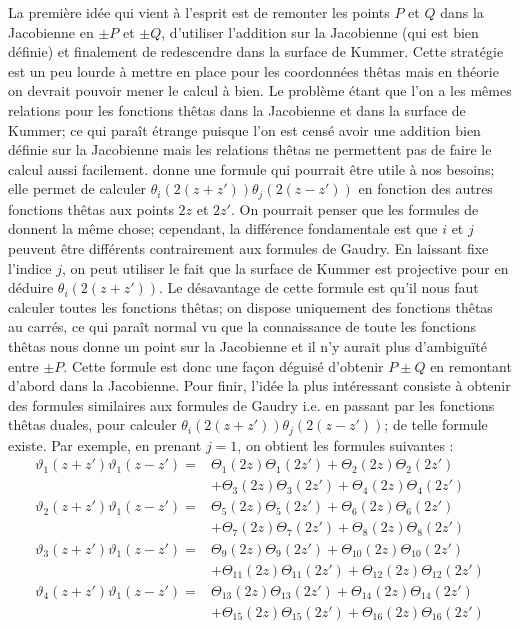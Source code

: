 \documentclass[a4paper]{article}
\theoremstyle{definition}
\theoremstyle{remark}
\numberwithin{equation}{section}
\begin{document}
La première idée qui vient à l'esprit est de remonter les points $P$ et $Q$ dans la Jacobienne en $\pm P$ et $\pm Q$, d'utiliser l'addition sur la Jacobienne (qui est bien définie) et finalement de redescendre dans la surface de Kummer. Cette stratégie est un peu lourde à mettre en place pour les coordonnées thêtas mais en théorie on devrait pouvoir mener le calcul à bien. Le problème étant que l'on a les mêmes relations pour les fonctions thêtas dans la Jacobienne et dans la surface de Kummer; ce qui paraît étrange puisque l'on est censé avoir une addition bien définie sur la Jacobienne mais les relations thêtas ne permettent pas de faire le calcul aussi facilement. \citet{cosset} donne une formule qui pourrait être utile à nos besoins; elle permet de calculer $\theta_i(2(z+z'))\theta_j(2(z-z'))$ en fonction des autres fonctions thêtas aux points $2z$ et $2z'$. On pourrait penser que les formules de \citet{gaudry} donnent la même chose; cependant, la différence fondamentale est que $i$ et $j$ peuvent être différents contrairement aux formules de Gaudry. En laissant fixe l'indice $j$, on peut utiliser le fait que la surface de Kummer est projective pour en déduire $\theta_i(2(z+z'))$. Le désavantage de cette formule est qu'il nous faut calculer toutes les fonctions thêtas; on dispose uniquement des fonctions thêtas au carrés, ce qui paraît normal vu que la connaissance de toute les fonctions thêtas nous donne un point sur la Jacobienne et il n'y aurait plus d'ambiguïté entre $\pm P$. Cette formule est donc une façon déguisé d'obtenir $P \pm Q$ en remontant d'abord dans la Jacobienne. Pour finir, l'idée la plus intéressant consiste à obtenir des formules similaires aux formules de Gaudry i.e. en passant par les fonctions thêtas duales, pour calculer $\theta_i(2(z+z'))\theta_j(2(z-z'))$; de telle formule existe. Par exemple, en prenant $j=1$, on obtient les formules suivantes :
\[
\begin{aligned}
\vartheta_1(z+z')\vartheta_1(z-z') ={}& \Theta_1(2z)\Theta_1(2z') + \Theta_2(2z)\Theta_2(2z')\\
 &+ \Theta_3(2z)\Theta_3(2z') + \Theta_4(2z)\Theta_4(2z') \\
\vartheta_2(z+z')\vartheta_1(z-z') ={}& \Theta_5(2z)\Theta_5(2z') + \Theta_6(2z)\Theta_6(2z') \\
 &+ \Theta_7(2z)\Theta_7(2z') + \Theta_8(2z)\Theta_8(2z') \\
\vartheta_3(z+z')\vartheta_1(z-z') ={}& \Theta_9(2z)\Theta_9(2z') + \Theta_{10}(2z)\Theta_{10}(2z') \\
 &+ \Theta_{11}(2z)\Theta_{11}(2z') + \Theta_{12}(2z)\Theta_{12}(2z') \\
\vartheta_4(z+z')\vartheta_1(z-z') ={}& \Theta_{13}(2z)\Theta_{13}(2z') + \Theta_{14}(2z)\Theta_{14}(2z') \\
 &+ \Theta_{15}(2z)\Theta_{15}(2z') + \Theta_{16}(2z)\Theta_{16}(2z') \\
\end{aligned}
\]
\end{document}
